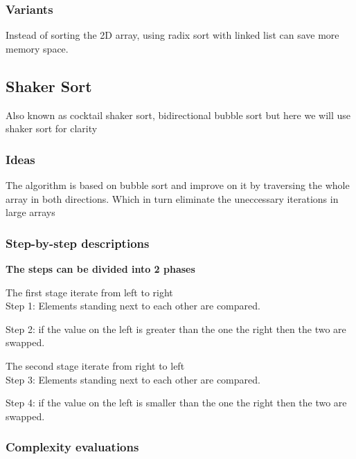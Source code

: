 \documentclass{article}
\newcommand\tab[1][0.5cm]{\hspace*{#1}}
\begin{document}
\subsubsection{Variants}

\tab Instead of sorting the 2D array, using radix sort with linked list can save more memory space.

\paragraph{\tab }

\pagebreak


\subsection{Shaker Sort}
Also known as cocktail shaker sort, bidirectional bubble sort but here we will use shaker sort for clarity
\subsubsection{Ideas}
\tab The algorithm is based on bubble sort and improve on it by traversing the whole array in both directions. Which in turn eliminate the uneccessary iterations in large arrays
\bigskip

\subsubsection{Step-by-step descriptions}
\textbf{The steps can be divided into 2 phases}

\tab The first stage iterate from left to right\\
\tab Step 1: Elements standing next to each other are compared.
\smallskip

Step 2: if the value on the left is greater than the one the right then the two are swapped.
\smallskip

\tab The second stage iterate from right to left\\
\tab Step 3: Elements standing next to each other are compared.
\smallskip

Step 4: if the value on the left is smaller than the one the right then the two are swapped.

\subsubsection{Complexity evaluations}
\end{document}
